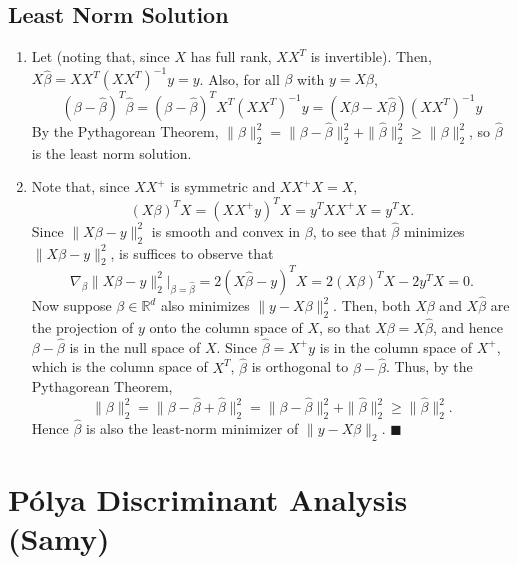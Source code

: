 \documentclass[11pt]{article}
\renewcommand{\qed}{\quad \ensuremath{\blacksquare}}
\newcommand{\inv}{^{-1}}
\newcommand{\R}{\mathbb{R}} %
\begin{document}
\subsection{Least Norm Solution}
\begin{enumerate}
\item Let \fbox{$\hat\beta := X^T(XX^T)\inv y$} (noting that, since $X$ has
full rank, $XX^T$ is invertible). Then, $X\hat\beta = XX^T(XX^T)\inv y = y$.
Also, for all $\beta$ with $y = X\beta$,
\[(\beta - \hat\beta)^T\hat\beta
    = (\beta - \hat\beta)^T X^T(XX^T)\inv y
    = (X\beta - X\hat\beta) (XX^T)\inv y
\]
By the Pythagorean Theorem,
$\|\beta\|_2^2
    = \|\beta - \hat\beta\|_2^2 + \|\hat\beta\|_2^2
    \geq \|\beta\|_2^2$,
so $\hat\beta$ is the least norm solution.
\item Note that, since $XX^+$ is symmetric and $XX^+X = X$,
\[(X\beta)^TX
    = (XX^+y)^TX
    = y^TXX^+X
    = y^TX.
\]
Since $\|X\beta - y\|_2^2$ is smooth and convex in $\beta$, to see that
$\hat\beta$ minimizes $\|X\beta - y\|_2^2$, is suffices to observe that
\[\nabla_\beta \|X\beta - y\|_2^2 \big|_{\beta = \hat\beta}
    = 2(X\hat\beta - y)^TX
    = 2(X\beta)^TX - 2y^TX
    = 0.
\]
Now suppose $\beta \in \R^d$ also minimizes $\|y - X\beta\|_2^2$. Then, both
$X\beta$ and $X\hat\beta$ are the projection of $y$ onto the column space of
$X$, so that $X\beta = X\hat\beta$, and hence $\beta - \hat\beta$ is in the
null space of $X$. Since $\hat\beta = X^+y$ is in the column space of $X^+$,
which is the column space of $X^T$, $\hat\beta$ is orthogonal to
$\beta - \hat\beta$. Thus, by the Pythagorean Theorem,
\[\|\beta\|_2^2
    = \|\beta - \hat\beta + \hat\beta\|_2^2
    = \|\beta - \hat\beta\|_2^2 + \|\hat\beta\|_2^2
    \geq \|\hat\beta\|_2^2.
\]
Hence $\hat\beta$ is also the least-norm minimizer of $\|y - X\beta\|_2$. \qed
\end{enumerate}

\section{P\'olya Discriminant Analysis (Samy)}
\end{document}
